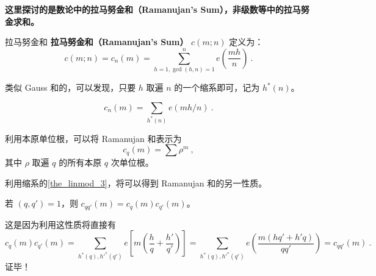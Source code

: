 

\textbf{这里探讨的是数论中的拉马努金和（Ramanujan's Sum），非级数等中的拉马努金求和。}

\begin{definition}{拉马努金和}
\textbf{拉马努金和（Ramanujan's Sum）} $c(m; n)$ 定义为：
\begin{equation}
c(m; n) = c_n(m) = \sum_{h=1, \gcd(h, n)=1}^{n} e\left(\frac{mh}{n}\right) ~.
\end{equation}
\end{definition}
类似 Gauss 和的，可以发现，只要 $h$ 取遍 $n$ 的一个缩系即可，记为 $h^*(n)$。
\begin{theorem}{}
\begin{equation}
c_n(m) = \sum_{h^*(n)} e\left(mh/n\right) ~.
\end{equation}

\end{theorem}

\begin{theorem}{}
利用本原单位根，可以将 Ramanujan 和表示为
\begin{equation}
c_q(m) = \sum \rho^m~,
\end{equation}
其中 $\rho$ 取遍 $q$ 的所有本原 $q$ 次单位根。
\end{theorem}

利用缩系的\autoref{the_linmod_3}，将可以得到 Ramanujan 和的另一性质。
\begin{theorem}{}
若 $(q, q') = 1$，则 $c_{qq'}(m) = c_q(m) c_{q'}(m)$。
\end{theorem}
这是因为利用这性质将直接有
\begin{equation}
c_q(m) c_{q'}(m) = \sum_{h^*(q), h'^*(q')} e\left[ m\left(\frac{h}{q} + \frac{h'}{q'}\right) \right] = \sum_{h^*(q), h'^*(q')} e\left( \frac{m(hq' + h'q)}{q q'} \right) = c_{qq'}(m)~.
\end{equation}
证毕！


